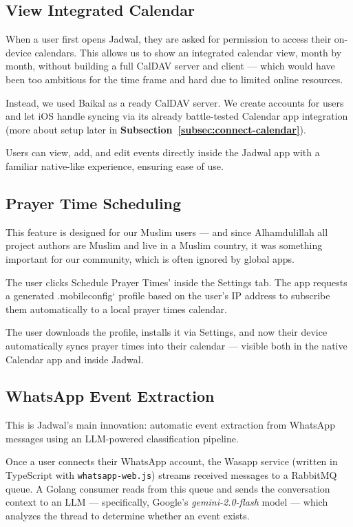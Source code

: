 \subsection{View Integrated Calendar}

When a user first opens Jadwal, they are asked for permission to access their on-device calendars. This allows us to show an integrated calendar view, month by month, without building a full CalDAV server and client — which would have been too ambitious for the time frame and hard due to limited online resources.

Instead, we used Baikal as a ready CalDAV server. We create accounts for users and let iOS handle syncing via its already battle-tested Calendar app integration (more about setup later in \textbf{Subsection~\ref{subsec:connect-calendar}}).

Users can view, add, and edit events directly inside the Jadwal app with a familiar native-like experience, ensuring ease of use.

\subsection{Prayer Time Scheduling} \label{subsec:schedule-prayer-times}

This feature is designed for our Muslim users — and since Alhamdulillah all project authors are Muslim and live in a Muslim country, it was something important for our community, which is often ignored by global apps.

The user clicks Schedule Prayer Times' inside the Settings tab. The app requests a generated .mobileconfig` profile based on the user's IP address to subscribe them automatically to a local prayer times calendar.

The user downloads the profile, installs it via Settings, and now their device automatically syncs prayer times into their calendar — visible both in the native Calendar app and inside Jadwal.

\subsection{WhatsApp Event Extraction} \label{subsec:whatsapp-event-extraction}

This is Jadwal's main innovation: automatic event extraction from WhatsApp messages using an LLM-powered classification pipeline.

Once a user connects their WhatsApp account, the Wasapp service (written in TypeScript with \texttt{whatsapp-web.js}) streams received messages to a RabbitMQ queue. A Golang consumer reads from this queue and sends the conversation context to an LLM — specifically, Google’s \textit{gemini-2.0-flash} model — which analyzes the thread to determine whether an event exists.

